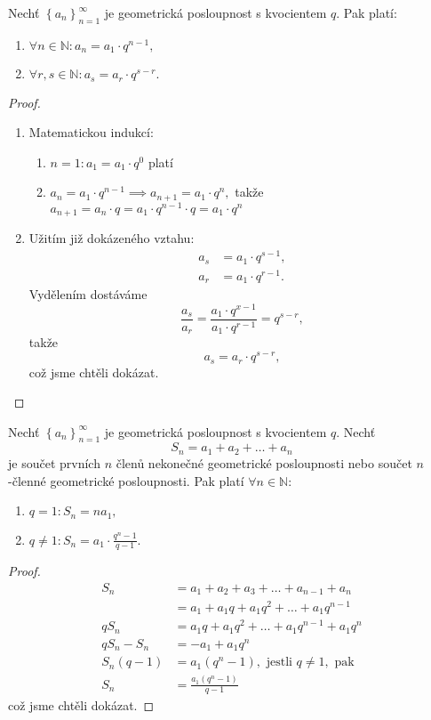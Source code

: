 \begin{veta}
    Nechť $\left \{ a_n \right \}_{n=1}^\infty $ je geometrická posloupnost s kvocientem
    $q$. Pak platí:
    \begin{enumerate}[$i.$]
    \item $\forall n\in \mathbb N: a_n = a_1 \cdot q^{n-1},$
   	\item $\forall r,s \in \mathbb N: a_s = a_r \cdot q^{s-r}.$
    \end{enumerate}
\end{veta}

\begin{proof}\,
\begin{enumerate}[$i.$]
\item Matematickou indukcí:
\begin{enumerate}[1.]
\item $n=1: a_1 = a_1\cdot q^0$ platí
\item $a_n = a_1\cdot q^{n-1}\implies a_{n+1}=a_1\cdot q^n,$ takže $a_{n+1}=a_n\cdot q=a_1\cdot q^{n-1}\cdot q=a_1\cdot q^n$
\end{enumerate}
\item Užitím již dokázeného vztahu:
\begin{align*}
    a_s &= a_1\cdot q^{s-1},\\
    a_r &= a_1\cdot q^{r-1}.
\end{align*}
Vydělením dostáváme
$$\frac{a_s}{a_r} = \frac{a_1\cdot q^{x-1}}{a_1\cdot q^{r-1}}=q^{s-r},$$
takže
$$a_s=a_r\cdot q^{s-r},$$
což jsme chtěli dokázat.\qedhere
\end{enumerate}
\end{proof}

\begin{veta}
Nechť $\left \{ a_n \right \}_{n=1}^\infty $ je geometrická posloupnost s kvocientem
$q$. Nechť
$$S_n=a_1+a_2+\dots+a_n$$
je součet prvních $n$ členů nekonečné geometrické posloupnosti nebo součet
$n$-členné geometrické posloupnosti. Pak platí $\forall n \in \mathbb N$:
\begin{enumerate}[$i.$]
\item $q=1: S_n=na_1,$
\item $q\ne 1: S_n = a_1\cdot \frac{q^n-1}{q-1}.$
\end{enumerate}
\end{veta}

\begin{proof}
\begin{align*}
    S_n &= a_1+a_2+a_3+\dots+a_{n-1}+a_n \\
    &= a_1 + a_1q+ a_1q^2+ \dots + a_1q^{n-1}\\
    qS_n &= a_1q + a_1q^2 +  \dots + a_1q^{n-1} + a_1q^n\\
    qS_n-S_n &= -a_1+a_1q^n\\
    S_n(q-1) &= a_1(q^n-1), \textrm{ jestli } q\ne 1, \textrm{ pak}\\
    S_n &= \frac{a_1(q^n-1)}{q-1}
\end{align*}
což jsme chtěli dokázat. \qedhere
\end{proof}

